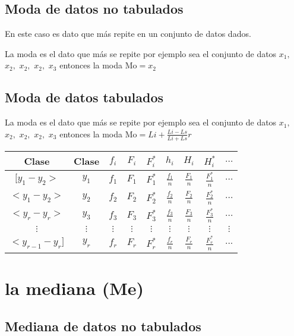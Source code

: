 \documentclass[10pt,]{krantz}
\theoremstyle{definition}
\theoremstyle{definition}
\theoremstyle{definition}
\theoremstyle{remark}
\begin{document}
\hypertarget{moda-de-datos-no-tabulados}{%
\subsection{Moda de datos no tabulados}\label{moda-de-datos-no-tabulados}}

En este caso es dato que más repite en un conjunto de datos dados.

La moda es el dato que más se repite por ejemplo sea el conjunto de datos \(x_1,\) \(x_2,\) \(x_2,\) \(x_2,\) \(x_3\) entonces la moda \(\text{Mo}=x_2\)

\hypertarget{moda-de-datos-tabulados}{%
\subsection{Moda de datos tabulados}\label{moda-de-datos-tabulados}}

La moda es el dato que más se repite por ejemplo sea el conjunto de datos \(x_1,\) \(x_2,\) \(x_2,\) \(x_2,\) \(x_3\) entonces la moda \(\text{Mo}=Li+\frac{Li-Ls}{Li+Ls}r\)

\begin{longtable}[]{@{}ccccccccc@{}}
\toprule
Clase & Clase & \(f_i\) & \(F_i\) & \(F_i^*\) & \(h_i\) & \(H_i\) & \(H_i^*\) & \(\ldots\)\tabularnewline
\midrule
\endhead
\([y_1-y_2>\) & \(y_1\) & \(f_1\) & \(F_1\) & \(F_1^*\) & \(\frac{f_1}{n}\) & \(\frac{F_1}{n}\) & \(\frac{F_1^*}{n}\) & \(\ldots\)\tabularnewline
\(<y_1-y_2>\) & \(y_2\) & \(f_2\) & \(F_2\) & \(F_2^*\) & \(\frac{f_2}{n}\) & \(\frac{F_2}{n}\) & \(\frac{F_2^*}{n}\) & \(\ldots\)\tabularnewline
\(<y_{r}-y_r>\) & \(y_3\) & \(f_3\) & \(F_3\) & \(F_3^*\) & \(\frac{f_3}{n}\) & \(\frac{F_3}{n}\) & \(\frac{F_3^*}{n}\) & \(\ldots\)\tabularnewline
\(\vdots\) & \(\vdots\) & \(\vdots\) & \(\vdots\) & \(\vdots\) & \(\vdots\) & \(\vdots\) & \(\vdots\) & \(\vdots\)\tabularnewline
\(<y_{r-1}-y_r]\) & \(y_r\) & \(f_r\) & \(F_r\) & \(F_r^*\) & \(\frac{f_r}{n}\) & \(\frac{F_r}{n}\) & \(\frac{F_r^*}{n}\) & \(...\)\tabularnewline
\bottomrule
\end{longtable}

\hypertarget{la-mediana-me}{%
\section{la mediana (Me)}\label{la-mediana-me}}

\hypertarget{mediana-de-datos-no-tabulados}{%
\subsection{Mediana de datos no tabulados}\label{mediana-de-datos-no-tabulados}}
\end{document}

